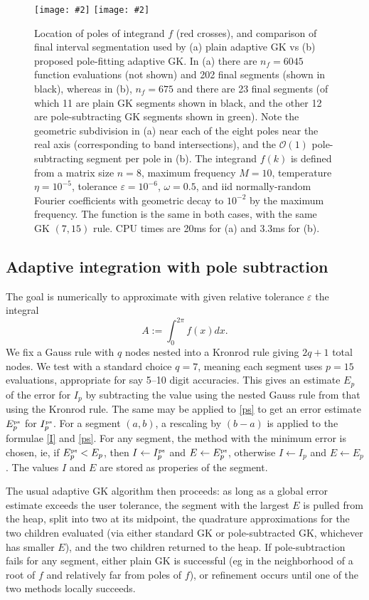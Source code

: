 \documentclass[11pt]{article}
\newcommand{\be}{\begin{equation}}
\newcommand{\ee}{\end{equation}}
\newcommand{\bfi}{\begin{figure}}
\newcommand{\efi}{\end{figure}}
\newcommand{\ca}[2]{\caption{#1 \label{#2}}}
\newcommand{\ig}[2]{\texttt{[image: \#2]}}
\newcommand{\tbox}[1]{{\mbox{\tiny #1}}}
\newcommand{\eps}{\varepsilon}
\newcommand{\bigO}{{\mathcal O}}
\begin{document}
  
\bfi %
\ig{width=\textwidth}{segsa}
\ig{width=\textwidth}{segsb}
\ca{Location of poles of integrand $f$ (red crosses),
  and comparison of final interval segmentation
  used by (a) plain adaptive GK vs (b) proposed pole-fitting adaptive GK.
  In (a) there are $n_f = 6045$ function evaluations (not shown) and 202 final segments
  (shown in black), whereas in (b), $n_f=675$ and there are 23 final segments
  (of which 11 are plain GK segments shown in black, and the other 12
  are pole-subtracting GK segments shown in green).
  Note the geometric subdivision in (a) near each of the
  eight poles near the real axis (corresponding to band intersections),
  and the $\bigO(1)$ pole-subtracting segment per pole in (b).
  The integrand $f(k)$ is defined from a matrix size
  $n=8$, maximum frequency $M=10$, temperature $\eta=10^{-5}$,
  tolerance $\eps=10^{-6}$, $\omega=0.5$, and iid normally-random
  Fourier coefficients with geometric decay to $10^{-2}$ by the maximum frequency.
  The function is the same in both cases, with the same GK $(7,15)$ rule.
  CPU times are 20ms for (a) and 3.3ms for (b).
}{f:polesegs}
\efi


\subsection{Adaptive integration with pole subtraction}
  
The goal is numerically to approximate with given relative tolerance $\eps$ the
integral
\be
A := \int_0^{2\pi} f(x) dx.
\label{Aagain}
\ee
We fix a Gauss rule with $q$ nodes nested into a Kronrod rule giving $2q+1$ total nodes.
We test with a standard choice $q=7$, meaning each segment uses $p=15$ evaluations,
appropriate for say 5--10 digit accuracies.
This gives an estimate $E_p$ of the error for $I_p$ by subtracting
the value using the nested Gauss rule from that using the Kronrod rule.
The same may be applied to \eqref{ps} to get an error estimate
$E^{\tbox{ps}}_p$ for $I^{\tbox{ps}}_p$.
For a segment $(a,b)$, a rescaling by $(b-a)$ is applied to the formulae
\eqref{I} and \eqref{ps}.
For any segment, the method with the minimum error is chosen, ie,
if $E^{\tbox{ps}}_p < E_p$, then
$I \leftarrow I^{\tbox{ps}}_p$ and $E \leftarrow E^{\tbox{ps}}_p$, otherwise
$I \leftarrow I_p$ and $E \leftarrow E_p$.
The values $I$ and $E$ are stored as properies of the segment.

The usual adaptive GK algorithm then proceeds:
as long as a global error estimate exceeds the user tolerance,
the segment with the largest $E$ is pulled from the heap,
split into two at its midpoint, the quadrature approximations for the two children
evaluated (via either standard GK or pole-subtracted GK, whichever has smaller $E$),
and the two children returned to the heap.
If pole-subtraction fails for any segment, either plain GK is successful
(eg in the neighborhood of a root of $f$ and relatively far from poles of $f$),
or refinement occurs until one of the two methods locally succeeds.
\end{document}

